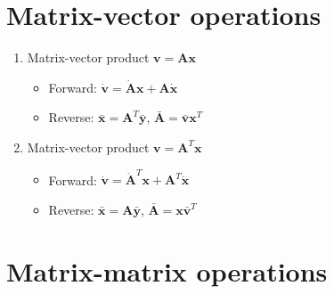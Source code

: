 \documentclass{article}
\begin{document}
\section{Matrix-vector operations}

\begin{enumerate}
\item Matrix-vector product $\mathbf{v} = \mathbf{A} \mathbf{x}$
\begin{itemize}
\item Forward: $\dot{\mathbf{v}} = \dot{\mathbf{A}} \mathbf{x} + \mathbf{A} \dot{\mathbf{x}}$
\item Reverse: $\bar{\mathbf{x}} = \mathbf{A}^{T} \bar{\mathbf{y}}$, $\bar{\mathbf{A}} = \bar{\mathbf{v}} \mathbf{x}^{T}$
\end{itemize}

\item Matrix-vector product $\mathbf{v} = \mathbf{A}^{T} \mathbf{x}$
\begin{itemize}
\item Forward: $\dot{\mathbf{v}} = \dot{\mathbf{A}}^{T} \mathbf{x} + \mathbf{A}^{T} \dot{\mathbf{x}}$
\item Reverse: $\bar{\mathbf{x}} = \mathbf{A} \bar{\mathbf{y}}$, $\bar{\mathbf{A}} = \mathbf{x} \bar{\mathbf{v}}^{T}$
\end{itemize}

\end{enumerate}

\section{Matrix-matrix operations}
\end{document}
